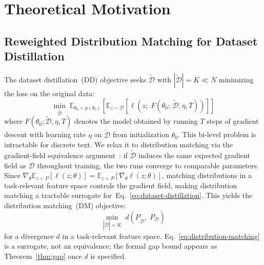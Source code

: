 \section{Theoretical Motivation} \label{sec:03-theory}
\subsection{Reweighted Distribution Matching for Dataset Distillation} \label{sec:03-theory-rdm}
\begin{foldable} %
  The dataset distillation~(DD) objective seeks $\tilde{\mathcal{D}}$ with $|\tilde{\mathcal{D}}| = K \ll N$ minimizing the loss on the original data:
  \begin{equation}
    \min_{\tilde{\mathcal{D}}}\; \mathbb{E}_{\theta_0 \sim p(\theta_0)} \left[ \mathbb{E}_{z \sim \mathcal{D}} \left[ \ell\!\left(z;\; F(\theta_0;\, \tilde{\mathcal{D}}, \eta, T)\right) \right] \right]
    \label{eq:dataset-distillation}
  \end{equation}
  where $F(\theta_0; \tilde{\mathcal{D}}, \eta, T)$ denotes the model obtained by running $T$ steps of gradient descent with learning rate $\eta$ on $\tilde{\mathcal{D}}$ from initialization $\theta_0$.
  This bi-level problem is intractable for discrete text.
  We relax it to distribution matching via the gradient-field equivalence argument~\cite{zhao2023dataset}: if $\tilde{\mathcal{D}}$ induces the same expected gradient field as $\mathcal{D}$ throughout training, the two runs converge to comparable parameters.
  Since $\nabla_\theta \mathbb{E}_{z \sim P}[\ell(z;\theta)] = \mathbb{E}_{z \sim P}[\nabla_\theta \ell(z;\theta)]$, matching distributions in a task-relevant feature space controls the gradient field, making distribution matching a tractable surrogate for~Eq.~\ref{eq:dataset-distillation}.
  This yields the distribution matching~(DM) objective:
  \begin{equation}
    \min_{|\tilde{\mathcal{D}}| = K}\; d\!\left(P_{\tilde{\mathcal{D}}},\; P_{\mathcal{D}}\right)
    \label{eq:distribution-matching}
  \end{equation}
  for a divergence $d$ in a task-relevant feature space.
  Eq.~\ref{eq:distribution-matching} is a surrogate, not an equivalence; the formal gap bound appears as Theorem~\ref{thm:gap} once $d$ is specified.
\end{foldable}

